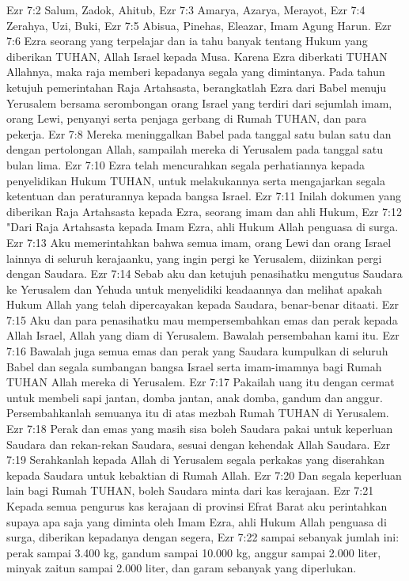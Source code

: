 Ezr 7:2  Salum, Zadok, Ahitub,
Ezr 7:3  Amarya, Azarya, Merayot,
Ezr 7:4  Zerahya, Uzi, Buki,
Ezr 7:5  Abisua, Pinehas, Eleazar, Imam Agung Harun.
Ezr 7:6  Ezra seorang yang terpelajar dan ia tahu banyak tentang Hukum yang diberikan TUHAN, Allah Israel kepada Musa. Karena Ezra diberkati TUHAN Allahnya, maka raja memberi kepadanya segala yang dimintanya. Pada tahun ketujuh pemerintahan Raja Artahsasta, berangkatlah Ezra dari Babel menuju Yerusalem bersama serombongan orang Israel yang terdiri dari sejumlah imam, orang Lewi, penyanyi serta penjaga gerbang di Rumah TUHAN, dan para pekerja.
Ezr 7:8  Mereka meninggalkan Babel pada tanggal satu bulan satu dan dengan pertolongan Allah, sampailah mereka di Yerusalem pada tanggal satu bulan lima.
Ezr 7:10  Ezra telah mencurahkan segala perhatiannya kepada penyelidikan Hukum TUHAN, untuk melakukannya serta mengajarkan segala ketentuan dan peraturannya kepada bangsa Israel.
Ezr 7:11  Inilah dokumen yang diberikan Raja Artahsasta kepada Ezra, seorang imam dan ahli Hukum,
Ezr 7:12  "Dari Raja Artahsasta kepada Imam Ezra, ahli Hukum Allah penguasa di surga.
Ezr 7:13  Aku memerintahkan bahwa semua imam, orang Lewi dan orang Israel lainnya di seluruh kerajaanku, yang ingin pergi ke Yerusalem, diizinkan pergi dengan Saudara.
Ezr 7:14  Sebab aku dan ketujuh penasihatku mengutus Saudara ke Yerusalem dan Yehuda untuk menyelidiki keadaannya dan melihat apakah Hukum Allah yang telah dipercayakan kepada Saudara, benar-benar ditaati.
Ezr 7:15  Aku dan para penasihatku mau mempersembahkan emas dan perak kepada Allah Israel, Allah yang diam di Yerusalem. Bawalah persembahan kami itu.
Ezr 7:16  Bawalah juga semua emas dan perak yang Saudara kumpulkan di seluruh Babel dan segala sumbangan bangsa Israel serta imam-imamnya bagi Rumah TUHAN Allah mereka di Yerusalem.
Ezr 7:17  Pakailah uang itu dengan cermat untuk membeli sapi jantan, domba jantan, anak domba, gandum dan anggur. Persembahkanlah semuanya itu di atas mezbah Rumah TUHAN di Yerusalem.
Ezr 7:18  Perak dan emas yang masih sisa boleh Saudara pakai untuk keperluan Saudara dan rekan-rekan Saudara, sesuai dengan kehendak Allah Saudara.
Ezr 7:19  Serahkanlah kepada Allah di Yerusalem segala perkakas yang diserahkan kepada Saudara untuk kebaktian di Rumah Allah.
Ezr 7:20  Dan segala keperluan lain bagi Rumah TUHAN, boleh Saudara minta dari kas kerajaan.
Ezr 7:21  Kepada semua pengurus kas kerajaan di provinsi Efrat Barat aku perintahkan supaya apa saja yang diminta oleh Imam Ezra, ahli Hukum Allah penguasa di surga, diberikan kepadanya dengan segera,
Ezr 7:22  sampai sebanyak jumlah ini: perak sampai 3.400 kg, gandum sampai 10.000 kg, anggur sampai 2.000 liter, minyak zaitun sampai 2.000 liter, dan garam sebanyak yang diperlukan.
